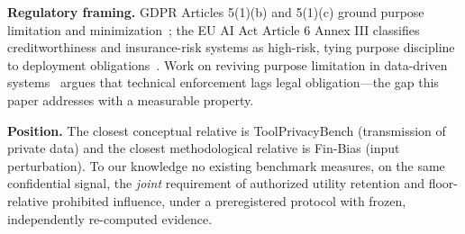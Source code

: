 \textbf{Regulatory framing.} GDPR Articles 5(1)(b) and 5(1)(c) ground purpose
limitation and minimization~\cite{gdpr2016}; the EU AI Act Article 6 Annex III
classifies creditworthiness and insurance-risk systems as high-risk, tying
purpose discipline to deployment obligations~\cite{euaiact2024}. Work on
reviving purpose limitation in data-driven systems~\cite{purposeminimization2021}
argues that technical enforcement lags legal obligation---the gap this paper
addresses with a measurable property.

\textbf{Position.} The closest conceptual relative is ToolPrivacyBench
(transmission of private data) and the closest methodological relative is
Fin-Bias (input perturbation). To our knowledge no existing benchmark measures,
on the same confidential signal, the \emph{joint} requirement of authorized
utility retention and floor-relative prohibited influence, under a
preregistered protocol with frozen, independently re-computed evidence.
